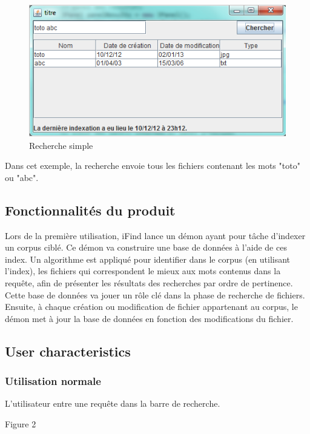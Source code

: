 \documentclass[a4paper,10pt]{article}
\begin{document}
\begin{figure}
\includegraphics[scale=0.7]{figure1.png}
\caption{Recherche simple}
\end{figure}

Dans cet exemple, la recherche envoie tous les fichiers contenant les mots
"toto" ou "abc".

\subsection{Fonctionnalités du produit}
Lors de la première utilisation, iFind lance un démon ayant pour tâche d’indexer
un corpus ciblé. 
Ce démon va construire une base de données à l’aide de ces index. Un algorithme
est appliqué pour identifier dans le corpus (en utilisant l'index), les fichiers
qui correspondent le mieux aux mots contenus dans la requête, afin de présenter
les résultats des recherches par ordre de pertinence. Cette base de données va
jouer un rôle clé dans la phase de recherche de fichiers.
Ensuite, à chaque création ou modification de fichier appartenant au corpus, le
démon met à jour la base de données en fonction des modifications du fichier.

\subsection{User characteristics}
\subsubsection{Utilisation normale}
L'utilisateur entre une requête dans la barre de recherche.

Figure 2
\end{document}

